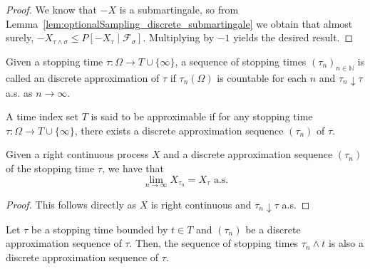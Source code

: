 \begin{proof}
We know that $-X$ is a submartingale, so from Lemma~\ref{lem:optionalSampling_discrete_submartingale} we obtain that almost surely, $-X_{\tau \wedge \sigma} \le P[-X_{\tau} \mid \mathcal{F}_{\sigma}]$. Multiplying by $-1$ yields the desired result.
\end{proof}

\begin{definition}\label{def:approxSeq}
  \leanok
  Given a stopping time \(\tau : \Omega \to T \cup \{\infty\}\), a sequence of stopping times \((\tau_n)_{n \in \mathbb{N}}\) is called an
  discrete approximation of \(\tau\) if \(\tau_n(\Omega)\) is countable for each \(n\) and \(\tau_n \downarrow \tau\) a.s. as \(n \to \infty\).
\end{definition}

\begin{definition}\label{def:approximableTimeIndex}
  \leanok
  A time index set \(T\) is said to be approximable if for any stopping time \(\tau : \Omega \to T \cup \{\infty\}\), there exists a discrete approximation sequence \((\tau_n)\) of \(\tau\).
\end{definition}

\begin{lemma}\label{lem:tendsto_stoppedValue_discreteApproxSequence}
  \leanok
  Given a right continuous process \(X\) and a discrete approximation sequence \((\tau_n)\) of the stopping time \(\tau\), we have that
  \[\lim_{n \to \infty} X_{\tau_n} = X_\tau \text{ a.s.}\]
\end{lemma}

\begin{proof}
  \leanok
  This follows directly as \(X\) is right continuous and \(\tau_n \downarrow \tau\) a.s.
\end{proof}

\begin{lemma}\label{lem:discreteApproxSequence_of}
  \leanok
  Let \(\tau\) be a stopping time bounded by \(t \in T\) and \((\tau_n)\) be a discrete approximation sequence of \(\tau\).
  Then, the sequence of stopping times \(\tau_n \wedge t\) is also a discrete approximation sequence of \(\tau\).
\end{lemma}

